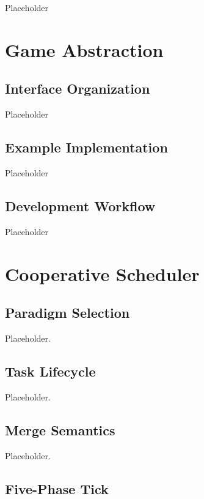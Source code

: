 \documentclass[conference]{IEEEtran}
\begin{document}
Placeholder

\section{Game Abstraction}

\subsection{Interface Organization}

Placeholder

\subsection{Example Implementation}

Placeholder

\subsection{Development Workflow}

Placeholder

\section{Cooperative Scheduler}

\subsection{Paradigm Selection}

Placeholder.

\subsection{Task Lifecycle}

Placeholder.

\subsection{Merge Semantics}

Placeholder.

\subsection{Five-Phase Tick}
\end{document}

